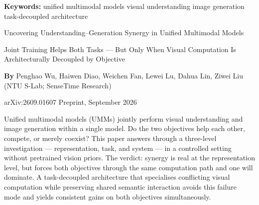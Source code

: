 \documentclass[10pt,twocolumn]{article}
\begin{document}
\setlength{\parindent}{0pt}
\setlength{\parskip}{4pt}

{\small\color{keywordgray}\textbf{Keywords:}
  unified multimodal models \textbullet{}
  visual understanding \textbullet{}
  image generation \textbullet{}
  task-decoupled architecture}\par\vspace{4pt}

{\LARGE\bfseries\raggedright
  Uncovering Understanding--Generation Synergy
  in Unified Multimodal Models}\par\vspace{4pt}

{\large\itshape\raggedright
  Joint Training Helps Both Tasks --- But Only
  When Visual Computation Is Architecturally
  Decoupled by Objective}\par\vspace{6pt}

{\small\textbf{By} Penghao Wu, Haiwen Diao, Weichen Fan, Lewei Lu,
  Dahua Lin, Ziwei Liu
  (NTU S-Lab; SenseTime Research)}\par\vspace{2pt}

{\small\color{keywordgray}arXiv:2609.01607 \textbullet{} Preprint, September 2026}
\par\vspace{2pt}\noindent{\color{rulered}\rule{\columnwidth}{0.6pt}}\vspace{6pt}

Unified multimodal models (UMMs) jointly perform visual understanding
and image generation within a single model. Do the two objectives help
each other, compete, or merely coexist? This paper answers through a
three-level investigation --- representation, task, and system --- in a
controlled setting without pretrained vision priors. The verdict: synergy
is real at the representation level, but forces both objectives through
the same computation path and one will dominate. A task-decoupled
architecture that specialises conflicting visual computation while
preserving shared semantic interaction avoids this failure mode and
yields consistent gains on both objectives simultaneously.
\end{document}
